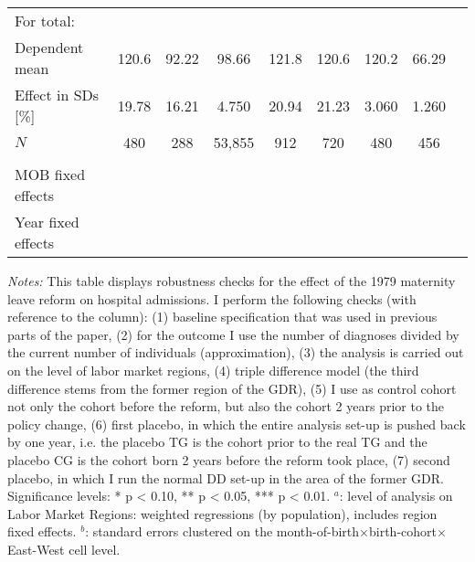 \begin{landscape}
\begin{table}[htbp]
\begin{threeparttable}
{\begin{tabular}{l*{8}{c}}
					For total: 																																					\\							 
					Dependent mean 		&   120.6			&	92.22			&   98.66     		&	121.8			&  120.6			&	120.2			&	66.29		\\
					Effect in SDs [\%] 	&   19.78			&	16.21			&   4.750      		&	20.94			&  21.23			&	3.060			&	1.260		\\
					$N$ 				&   480				&	288				&   53,855    		&	912				&  720				&	480				&	456			\\
					\\
					MOB fixed effects 	&   \checkmark		&	\checkmark		&   \checkmark		& \checkmark		& \checkmark		&	\checkmark		&  \checkmark	\\ 
					Year fixed effects  &   \checkmark		&	\checkmark		&   \checkmark		& \checkmark		& \checkmark		&	\checkmark		&  \checkmark	\\ 
					\bottomrule
			\end{tabular}}
	\end{threeparttable} 
		\begin{minipage}{0.66\linewidth}
		\scriptsize \emph{Notes:} This table displays robustness checks for the effect of the 1979 maternity leave reform on hospital admissions. I perform the following checks (with reference to the column): (1) baseline specification that was used in previous parts of the paper, (2) for the outcome I use the number of diagnoses divided by the current number of individuals (approximation), (3) the analysis is carried out on the level of labor market regions, (4) triple difference model (the third difference stems from the former region of the GDR), (5) I use as control cohort not only the cohort before the reform, but also the cohort 2 years prior to the policy change, (6) first placebo, in which the entire analysis set-up is pushed back by one year, i.e. the placebo TG is the cohort prior to the real TG and the placebo CG is the cohort born 2 years before the reform took place, (7) second placebo, in which I run the normal DD set-up in the area of the former GDR. \newline Significance levels: * p < 0.10, ** p < 0.05, *** p < 0.01. \newline
		\hspace*{15 pt}$^a$: level of analysis on Labor Market Regions: weighted regressions (by population), includes region fixed effects.\newline
		\hspace*{15 pt}$^b$: standard errors clustered on the month-of-birth$\times$birth-cohort$\times$East-West cell level.
	\end{minipage}
\end{table} 
	\vspace*{\fill}\clearpage
\end{landscape}






